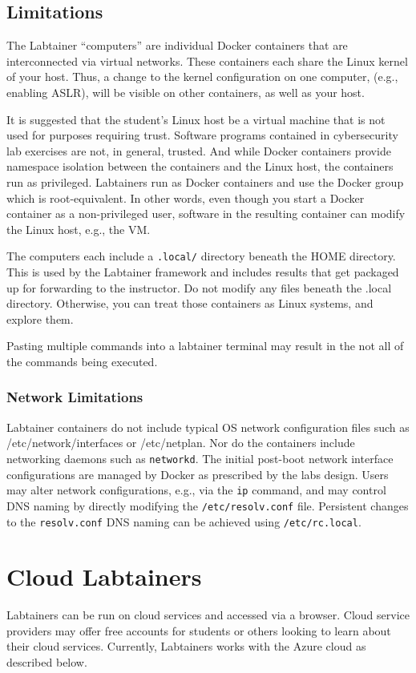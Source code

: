 \documentclass[12pt]{article}
\begin{document}
\subsection{Limitations}
The Labtainer ``computers'' are individual Docker containers that are interconnected via virtual
networks.  These containers each share the Linux kernel of your host.  Thus, a change
to the kernel configuration on one computer, (e.g., enabling ASLR), will be visible on
other containers, as well as your host.

It is suggested that the student's Linux host be a virtual machine that is
not used for purposes requiring trust.  Software programs contained in cybersecurity lab
exercises are not, in general, trusted.  And while Docker containers provide namespace
isolation between the containers and the Linux host, the containers run as privileged.
Labtainers run as Docker containers and use the Docker group 
which is root-equivalent.  In other words, even though you start a Docker container
as a non-privileged user, software in the resulting container can modify the Linux host,
e.g., the VM.

The computers each include a {\tt .local/} directory beneath the HOME directory.  This is used
by the Labtainer framework and includes results that get packaged up for forwarding to the
instructor.  Do not modify any files beneath the .local directory.  Otherwise, you can treat
those containers as Linux systems, and explore them.

Pasting multiple commands into a labtainer terminal may result in the not all of the
commands being executed.

\subsubsection{Network Limitations}
Labtainer containers do not include typical OS network configuration files such as /etc/network/interfaces
or /etc/netplan.  Nor do the containers include networking daemons such as {\tt networkd}.  The initial post-boot network interface
configurations are managed by Docker as prescribed by the labs design.  Users may alter network configurations, e.g., 
via the {\tt ip} command, and may control DNS naming by directly modifying the {\tt /etc/resolv.conf} file.  Persistent
changes to the {\tt resolv.conf} DNS naming can be achieved using {\tt /etc/rc.local}.

\section{Cloud Labtainers}
\label{cloud-labtainers}
Labtainers can be run on cloud services and accessed via a browser.
Cloud service providers may offer free accounts for students or others looking to learn about their cloud services.
Currently, Labtainers works with the Azure cloud as described below.
\end{document}
